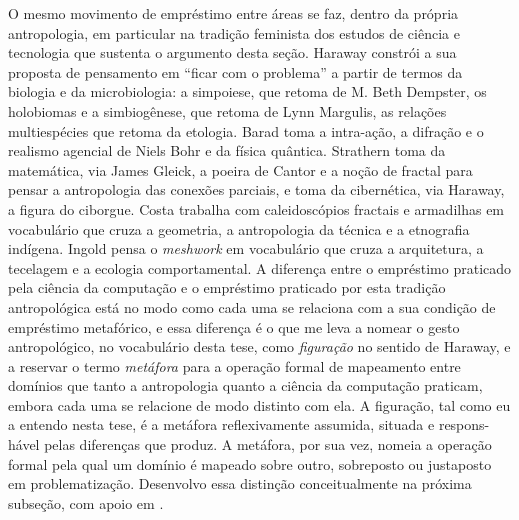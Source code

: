 O mesmo movimento de empréstimo entre áreas se faz, dentro da própria antropologia, em particular na tradição feminista dos estudos de ciência e tecnologia que sustenta o argumento desta seção. Haraway constrói a sua proposta de pensamento em \enquote{ficar com o problema} a partir de termos da biologia e da microbiologia: a simpoiese, que retoma de M. Beth Dempster, os holobiomas e a simbiogênese, que retoma de Lynn Margulis, as relações multiespécies que retoma da etologia. Barad toma a intra-ação, a difração e o realismo agencial de Niels Bohr e da física quântica. Strathern toma da matemática, via James Gleick, a poeira de Cantor e a noção de fractal para pensar a antropologia das conexões parciais, e toma da cibernética, via Haraway, a figura do ciborgue. Costa trabalha com caleidoscópios fractais e armadilhas em vocabulário que cruza a geometria, a antropologia da técnica e a etnografia indígena. Ingold pensa o \textit{meshwork} em vocabulário que cruza a arquitetura, a tecelagem e a ecologia comportamental. A diferença entre o empréstimo praticado pela ciência da computação e o empréstimo praticado por esta tradição antropológica está no modo como cada uma se relaciona com a sua condição de empréstimo metafórico, e essa diferença é o que me leva a nomear o gesto antropológico, no vocabulário desta tese, como \textit{figuração} no sentido de Haraway, e a reservar o termo \textit{metáfora} para a operação formal de mapeamento entre domínios que tanto a antropologia quanto a ciência da computação praticam, embora cada uma se relacione de modo distinto com ela. A figuração, tal como eu a entendo nesta tese, é a metáfora reflexivamente assumida, situada e respons-hável pelas diferenças que produz. A metáfora, por sua vez, nomeia a operação formal pela qual um domínio é mapeado sobre outro, sobreposto ou justaposto em problematização. Desenvolvo essa distinção conceitualmente na próxima subseção, com apoio em \textcite{Haraway2016Staying}.

